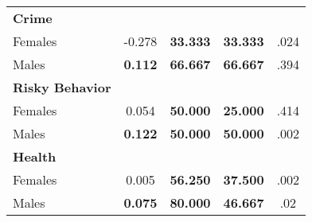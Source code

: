 \begin{tabular}{l c c c c}
\midrule
\textbf{Crime} & & & & \\
\quad Females &     -0.278 & \textbf{   33.333} & \textbf{   33.333} & .024 \\
\quad Males &  \textbf{    0.112} & \textbf{   66.667} & \textbf{   66.667} & .394 \\
\midrule
\textbf{Risky Behavior} & & & & \\
\quad Females &      0.054 & \textbf{   50.000} & \textbf{   25.000} & .414 \\
\quad Males &  \textbf{    0.122} & \textbf{   50.000} & \textbf{   50.000} & .002 \\
\midrule
\textbf{Health} & & & & \\
\quad Females &      0.005 & \textbf{   56.250} & \textbf{   37.500} & .002 \\
\quad Males &  \textbf{    0.075} & \textbf{   80.000} & \textbf{   46.667} & .02 \\
\bottomrule
\end{tabular}
